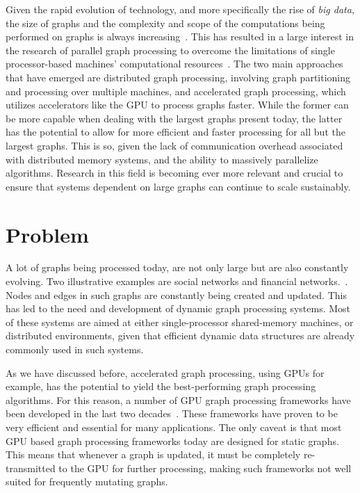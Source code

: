 Given the rapid evolution of technology, and more specifically the rise of\textit{ big data}, the size of graphs and the complexity and scope of the computations being performed on graphs is always increasing~\cite{paper:graph_processing_accelerators}. 
This has resulted in a large interest in the research of parallel graph processing to overcome the limitations of single processor-based machines' computational resources~\cite{survey:graph_processing_landscape}. The two main approaches that have emerged are distributed graph processing, involving graph partitioning and processing over multiple machines, and accelerated graph processing, which utilizes accelerators like the \gls{GPU} to process graphs faster. 
While the former can be more capable when dealing with the largest graphs present today, the latter has the potential to allow for more efficient and faster processing for all but the largest graphs. This is so, given the lack of communication overhead associated with distributed memory systems, and the ability to massively parallelize algorithms. 
Research in this field is becoming ever more relevant and crucial to ensure that systems dependent on large graphs can continue to scale sustainably.

\section{Problem}

A lot of graphs being processed today, are not only large but are also constantly evolving. Two illustrative examples are social networks and financial networks.~\cite{paper:custinger}. Nodes and edges in such graphs are constantly being created and updated. This has led to the need and development of dynamic graph processing systems. Most of these systems are aimed at either single-processor shared-memory machines, or distributed environments, given that efficient dynamic data structures are already commonly used in such systems.

As we have discussed before, accelerated graph processing, using \gls{GPU}s for example, has the potential to yield the best-performing graph processing algorithms. For this reason, a number of \gls{GPU} graph processing frameworks have been developed in the last two decades~\cite{paper:gunrock, paper:hornet, book:cugraph}. These frameworks have proven to be very efficient and essential for many applications. The only caveat is that most \gls{GPU} based graph processing frameworks today are designed for static graphs. This means that whenever a graph is updated, it must be completely re-transmitted to the \gls{GPU} for further processing, making such frameworks not well suited for frequently mutating graphs.

